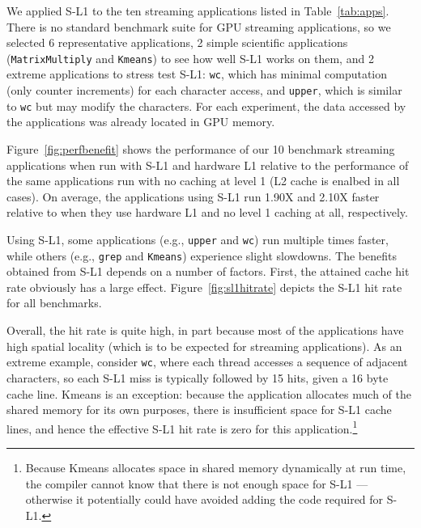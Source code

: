 We applied S-L1 to the ten streaming applications listed in Table~\ref{tab:apps}. 
There is no standard benchmark suite for GPU streaming applications, so we selected 6 representative applications, 2 simple scientific applications (\texttt{MatrixMultiply} and \texttt{Kmeans}) to see how well S-L1 works on them, and 2 extreme applications to stress test S-L1: \texttt{wc}, which has minimal computation (only counter increments) for each character access, and \texttt{upper}, which is similar to \texttt{wc} but may modify the characters.
For each experiment, the data accessed by the applications was already located in GPU memory.


Figure~\ref{fig:perfbenefit} shows the performance of our 10 benchmark streaming applications when run with S-L1 and hardware L1 
relative to the performance of the same applications run with no caching at level 1 (L2 cache is enalbed in all cases).
On average, the applications using S-L1 run 1.90X and 2.10X faster relative to when they use hardware L1 and no level 1 caching at all, respectively.


Using S-L1, some applications (e.g., \texttt{upper} and \texttt{wc}) run multiple times faster, while others (e.g., \texttt{grep} and \texttt{Kmeans}) experience slight slowdowns.
The benefits obtained from S-L1 depends on a number of factors.
First, the attained cache hit rate obviously has a large effect.
Figure~\ref{fig:sl1hitrate} depicts the S-L1 hit rate for all benchmarks. 



Overall, the hit rate is quite high, in part because most of the applications have high spatial
locality (which is to be expected for streaming applications). 
As an extreme example, consider \texttt{wc}, where each thread accesses a sequence of adjacent characters, so each S-L1 miss is typically followed by 15 hits, given a 16 byte cache line.
Kmeans is an exception: because the application allocates much of the shared memory for its own purposes, there is insufficient space for S-L1 cache lines, and hence the effective S-L1 hit rate is zero for this application.\footnote{
	Because Kmeans allocates space in shared memory dynamically at run time,
	the compiler cannot know that there is not enough space for S-L1 ---
	otherwise it potentially could have avoided adding the code required for S-L1.}

